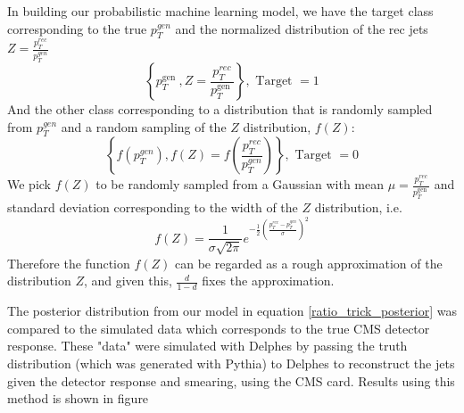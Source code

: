 In building our probabilistic machine learning model, we have the target class corresponding to the true $p_T^{gen}$ and the normalized distribution of the rec jets $Z= \frac{p_T^{rec}}{p_T^{gen}}$
\begin{equation}
    \left\{p_{T}^{\text {gen }}, Z=\frac{p_{T}^{r e c}}{p_{T}^{\text {gen }}}\right\}, \text { Target }=1
\end{equation}
And the other class corresponding to a distribution that is randomly sampled from $p_T^{gen}$ and a random sampling of the $Z$ distribution, $f(Z)$:
\begin{equation}
    \left\{f\left(p_{T}^{g e n}\right), f(Z)=f\left(\frac{p_{T}^{r e c}}{p_{T}^{g e n}}\right)\right\}, \text { Target }=0
\end{equation}
We pick $f(Z)$  to be randomly sampled from a Gaussian with mean $\mu=\frac{p_{T}^{r e c}}{p_{T}^{\text {gen }}}$ and standard deviation corresponding to the width of the $Z$ distribution, i.e.
\begin{equation}
f(Z)=\frac{1}{\sigma \sqrt{2 \pi}} e^{-\frac{1}{2}\left(\frac{p_T^{rec}-p_T^{gen}}{\sigma}\right)^{2}}
\end{equation}
Therefore the function $f(Z)$ can be regarded as a rough approximation of the distribution $Z$, and given this, $\frac{d}{1-d}$ fixes the approximation.

The posterior distribution from our model in equation \ref{ratio_trick_posterior} was compared to the simulated data which corresponds to the true CMS detector response. These "data" were simulated with Delphes by passing the truth distribution (which was generated with Pythia) to Delphes to reconstruct the jets given the detector response and smearing, using the CMS card. Results using this method is shown in figure

